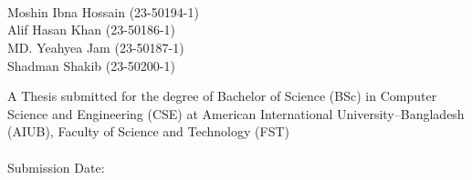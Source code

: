 \begin{titlepage}
\begin{center}

{\Large \textbf{\university}}\\[0.3cm]
{\large \faculty}\\[2.0cm]

{\LARGE \textbf{\thesistitle}}\\[2.0cm]

{\large
Moshin Ibna Hossain (23-50194-1)\\[0.25cm]
Alif Hasan Khan (23-50186-1)\\[0.25cm]
MD. Yeahyea Jam (23-50187-1)\\[0.25cm]
Shadman Shakib (23-50200-1)\\[2.0cm]
}

{\large A Thesis submitted for the degree of Bachelor of Science (BSc) in
Computer Science and Engineering (CSE) at American International
University--Bangladesh (AIUB), Faculty of Science and Technology (FST)}\\[1.6cm]

{\large \textbf{\semester}}\\[0.4cm]
{\large Submission Date: }

\end{center}
\end{titlepage}
\clearpage
